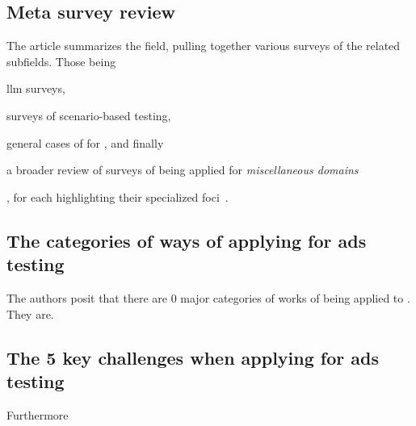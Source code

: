 \subsection{Meta survey review}

The article summarizes the field, pulling together various surveys of the
related subfields. Those being \begin{inparaenum}
    \item \acrshort{llm} surveys,
    \item surveys of scenario-based testing,
    \item general cases of  for , and finally
    \item a broader review of surveys of  being applied for
    \textit{miscellaneous domains}
\end{inparaenum},
for each highlighting their specialized
foci~\cite[2]{surveyLLMScenarioBasedTesting}.

\subsection{The categories of ways of applying  for \acrshort{ads} testing}

The authors posit that there are \num{0} major categories of works of
 being applied to . They are.

\subsection{The \num{5} key challenges when applying  for
    \acrshort{ads} testing}

Furthermore

